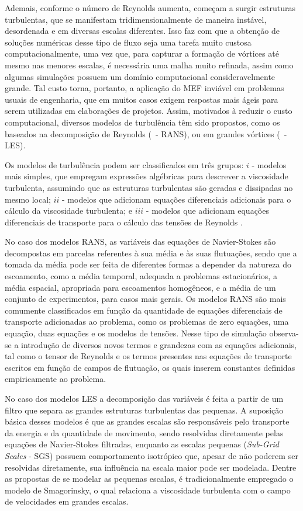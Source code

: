 Ademais, conforme o número de Reynolds aumenta, começam a surgir estruturas turbulentas, que se manifestam tridimensionalmente de maneira instável, desordenada e em diversas escalas diferentes. Isso faz com que a obtenção de soluções numéricas desse tipo de fluxo seja uma tarefa muito custosa computacionalmente, uma vez que, para capturar a formação de vórtices até mesmo nas menores escalas, é necessária uma malha muito refinada, assim como algumas simulações possuem um domínio computacional consideravelmente grande. Tal custo torna, portanto, a aplicação do MEF inviável em problemas usuais de engenharia, que em muitos casos exigem respostas mais ágeis para serem utilizadas em elaborações de projetos. Assim, motivados à reduzir o custo computacional, diversos modelos de turbulência têm sido propostos, como os baseados na decomposição de Reynolds (\RANS\ - RANS), ou em grandes vórtices (\LES\ - LES).

Os modelos de turbulência podem ser classificados em três grupos: $i$ - modelos mais simples, que empregam expressões algébricas para descrever a viscosidade turbulenta, assumindo que as estruturas turbulentas são geradas e dissipadas no mesmo local; $ii$ - modelos que adicionam equações diferenciais adicionais para o cálculo da viscosidade turbulenta; e $iii$ - modelos que adicionam equações diferenciais de transporte para o cálculo das tensões de Reynolds \cite{souza2011revisao,alfonsi2009reynolds,teixeira2001simulaccao}.

No caso dos modelos RANS, as variáveis das equações de Navier-Stokes são decompostas em parcelas referentes à sua média e às suas flutuações, sendo que a tomada da média pode ser feita de diferentes formas a depender da natureza do escoamento, como a média temporal, adequada a problemas estacionários, a média espacial, apropriada para escoamentos homogêneos, e a média de um conjunto de experimentos, para casos mais gerais. Os modelos RANS são mais comumente classificados em função da quantidade de equações diferenciais de transporte adicionadas ao problema, como os problemas de zero equações, uma equação, duas equações e os modelos de tensões. Nesse tipo de simulação observa-se a introdução de diversos novos termos e grandezas com as equações adicionais, tal como o tensor de Reynolds e os termos presentes nas equações de transporte escritos em função de campos de flutuação, os quais inserem constantes definidas empiricamente ao problema.

No caso dos modelos LES a decomposição das variáveis é feita a partir de um filtro que separa as grandes estruturas turbulentas das pequenas. A suposição básica desses modelos é que as grandes escalas são responsáveis pelo transporte da energia e da quantidade de movimento, sendo resolvidas diretamente pelas equações de Navier-Stokes filtradas, enquanto as escalas pequenas (\textit{Sub-Grid Scales} - SGS) possuem comportamento isotrópico que, apesar de não poderem ser resolvidas diretamente, sua influência na escala maior pode ser modelada. Dentre as propostas de se modelar as pequenas escalas, é tradicionalmente empregado o modelo de Smagorinsky, o qual relaciona a viscosidade turbulenta com o campo de velocidades em grandes escalas.

